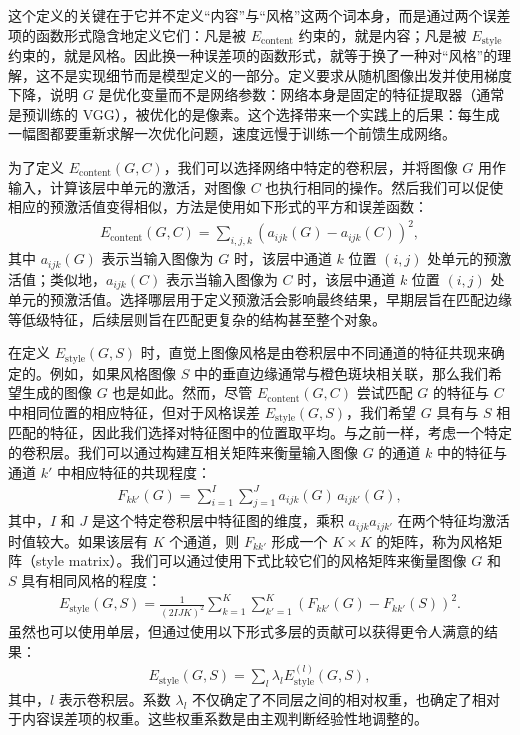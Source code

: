 \documentclass[../../main.tex]{subfiles}
\begin{document}
\begin{remark}
这个定义的关键在于它并不定义“内容”与“风格”这两个词本身，而是通过两个误差项的函数形式隐含地定义它们：凡是被 $E_{\mathrm{content}}$ 约束的，就是内容；凡是被 $E_{\mathrm{style}}$ 约束的，就是风格。因此换一种误差项的函数形式，就等于换了一种对“风格”的理解，这不是实现细节而是模型定义的一部分。定义要求从随机图像出发并使用梯度下降，说明 $G$ 是优化变量而不是网络参数：网络本身是固定的特征提取器（通常是预训练的 VGG），被优化的是像素。这个选择带来一个实践上的后果：每生成一幅图都要重新求解一次优化问题，速度远慢于训练一个前馈生成网络。
\end{remark}

为了定义 $E_{\mathrm{content}}(G,C)$，我们可以选择网络中特定的卷积层，并将图像 $G$ 用作输入，计算该层中单元的激活，对图像 $C$ 也执行相同的操作。然后我们可以促使相应的预激活值变得相似，方法是使用如下形式的平方和误差函数：
\begin{align}
  E_{\mathrm{content}}(G,C)=\sum_{i,j,k}\left(a_{ijk}(G)-a_{ijk}(C)\right)^2,
  \label{align:ch10-内容误差}
\end{align}
其中 $a_{ijk}(G)$ 表示当输入图像为 $G$ 时，该层中通道 $k$ 位置 $(i,j)$ 处单元的预激活值；类似地，$a_{ijk}(C)$ 表示当输入图像为 $C$ 时，该层中通道 $k$ 位置 $(i,j)$ 处单元的预激活值。选择哪层用于定义预激活会影响最终结果，早期层旨在匹配边缘等低级特征，后续层则旨在匹配更复杂的结构甚至整个对象。

在定义 $E_{\mathrm{style}}(G,S)$ 时，直觉上图像风格是由卷积层中不同通道的特征共现来确定的。例如，如果风格图像 $S$ 中的垂直边缘通常与橙色斑块相关联，那么我们希望生成的图像 $G$ 也是如此。然而，尽管 $E_{\mathrm{content}}(G,C)$ 尝试匹配 $G$ 的特征与 $C$ 中相同位置的相应特征，但对于风格误差 $E_{\mathrm{style}}(G,S)$，我们希望 $G$ 具有与 $S$ 相匹配的特征，因此我们选择对特征图中的位置取平均。与之前一样，考虑一个特定的卷积层。我们可以通过构建互相关矩阵来衡量输入图像 $G$ 的通道 $k$ 中的特征与通道 $k'$ 中相应特征的共现程度：
\begin{align}
  F_{kk'}(G)=\sum_{i=1}^{I}\sum_{j=1}^{J}a_{ijk}(G)\,a_{ijk'}(G),
  \label{align:ch10-Gram矩阵}
\end{align}
其中，$I$ 和 $J$ 是这个特定卷积层中特征图的维度，乘积 $a_{ijk}a_{ijk'}$ 在两个特征均激活时值较大。如果该层有 $K$ 个通道，则 $F_{kk'}$ 形成一个 $K\times K$ 的矩阵，称为风格矩阵（style matrix）。我们可以通过使用下式比较它们的风格矩阵来衡量图像 $G$ 和 $S$ 具有相同风格的程度：
\begin{align}
  E_{\mathrm{style}}(G,S)=\frac{1}{(2IJK)^2}\sum_{k=1}^{K}\sum_{k'=1}^{K}\left(F_{kk'}(G)-F_{kk'}(S)\right)^2.
  \label{align:ch10-风格误差}
\end{align}
虽然也可以使用单层，但通过使用以下形式多层的贡献可以获得更令人满意的结果：
\begin{align}
  E_{\mathrm{style}}(G,S)=\sum_{l}\lambda_l E_{\mathrm{style}}^{(l)}(G,S),
  \label{align:ch10-多层风格误差}
\end{align}
其中，$l$ 表示卷积层。系数 $\lambda_l$ 不仅确定了不同层之间的相对权重，也确定了相对于内容误差项的权重。这些权重系数是由主观判断经验性地调整的。
\end{document}

